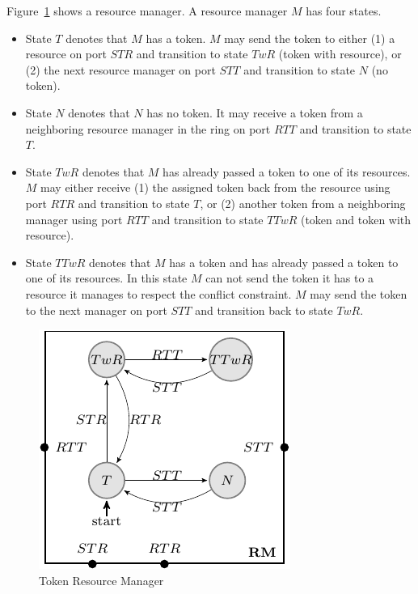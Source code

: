 Figure~\ref{fig:conflict-token} shows a resource manager.
A resource manager $M$ has four states. 
\begin{itemize}
  \item State $T$ denotes that $M$ has a token. $M$ may send the token to either 
    (1) a resource on port $STR$ and transition to state $TwR$ (token with resource), or 
    (2) the next resource manager on port $STT$ and transition to state $N$ (no token).
  \item State $N$ denotes that $N$ has no token. 
    It may receive a token from a neighboring resource manager in the ring on port $RTT$ 
    and transition to state $T$. 
  \item State $TwR$ denotes that $M$ has already passed a token to one of its resources. 
    $M$ may either receive (1) the assigned token back from the resource using port $RTR$ and transition to state $T$, 
    or (2) another token from a neighboring manager using port $RTT$ and transition to state $TTwR$ (token and token with resource).
  \item State $TTwR$ denotes that $M$ has a token and has already passed a token to one of its resources. 
    In this state $M$ can not send the token it has to a resource it manages to respect the conflict constraint. 
    $M$ may send the token to the next manager on port $STT$ and transition back to state $TwR$. 
\end{itemize}

\begin{figure}[H]
\begin{center}
\includegraphics[scale=1.2]{compiledfigures/token-crop.pdf}
\caption{Token Resource Manager}
\label{fig:conflict-token}
\end{center}
\end{figure}

